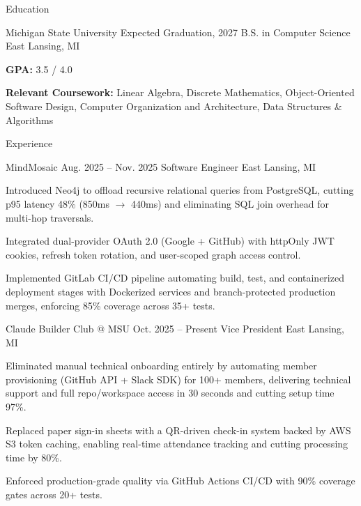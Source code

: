 \documentclass[
	11pt
]{../../../resume}
\begin{document}
	\begin{rSection}{E}{ducation}
		\begin{rSectionEntry}
			{Michigan State University}
			{Expected Graduation, 2027}
			{B.S. in Computer Science}
			{}
			{East Lansing, MI}

			\item \textbf{GPA:} 3.5 / 4.0
			\item \textbf{Relevant Coursework:} Linear Algebra, Discrete Mathematics, Object-Oriented Software Design, Computer Organization and Architecture, Data Structures \& Algorithms
		\end{rSectionEntry}
	\end{rSection}

	\begin{rSection}{E}{xperience}
		\begin{rSectionEntry}
			{MindMosaic}
			{Aug. 2025 -- Nov. 2025}
			{Software Engineer}
			{}
			{East Lansing, MI}

			\item Introduced Neo4j to offload recursive relational queries from PostgreSQL, cutting p95 latency 48\% (850ms $\rightarrow$ 440ms) and eliminating SQL join overhead for multi-hop traversals.
			\item Integrated dual-provider OAuth 2.0 (Google + GitHub) with httpOnly JWT cookies, refresh token rotation, and user-scoped graph access control.
			\item Implemented GitLab CI/CD pipeline automating build, test, and containerized deployment stages with Dockerized services and branch-protected production merges, enforcing 85\% coverage across 35+ tests.
		\end{rSectionEntry}

		\begin{rSectionEntry}
			{Claude Builder Club @ MSU}
			{Oct. 2025 -- Present}
			{Vice President}
			{}
			{East Lansing, MI}

			\item Eliminated manual technical onboarding entirely by automating member provisioning (GitHub API + Slack SDK) for 100+ members, delivering technical support and full repo/workspace access in 30 seconds and cutting setup time 97\%.
			\item Replaced paper sign-in sheets with a QR-driven check-in system backed by AWS S3 token caching, enabling real-time attendance tracking and cutting processing time by 80\%.
			\item Enforced production-grade quality via GitHub Actions CI/CD with 90\% coverage gates across 20+ tests.
		\end{rSectionEntry}
	\end{rSection}
\end{document}
